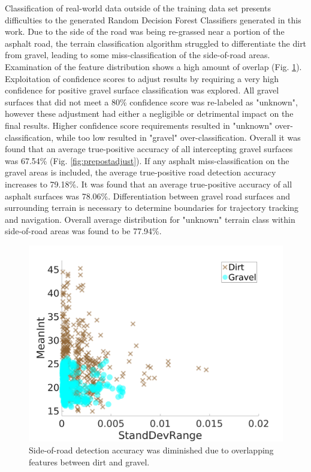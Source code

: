 \documentclass[journal,onecolumn]{IEEEtran}
\begin{document}
		{Classification of real-world data outside of the training data set presents difficulties to the generated Random Decision Forest Classifiers generated in this work. Due to the side of the road was being re-grassed near a portion of the asphalt road, the terrain classification algorithm struggled to differentiate the dirt from gravel, leading to some miss-classification of the side-of-road areas. Examination of the feature distribution shows a high amount of overlap (Fig. \ref{fig:dirt_v_gravel}). Exploitation of confidence scores to adjust results by requiring a very high confidence for positive gravel surface classification was explored. All gravel surfaces that did not meet a 80\% confidence score was re-labeled as "unknown", however these adjustment had either a negligible or detrimental impact on the final results. Higher confidence score requirements resulted in "unknown" over-classification, while too low resulted in "gravel" over-classification. Overall it was found that an average true-positive accuracy of all intercepting gravel surfaces was 67.54\% (Fig. \ref{fig:prepostadjust}). If any asphalt miss-classification on the gravel areas is included, the average true-positive road detection accuracy increases to 79.18\%. It was found that an average true-positive accuracy of all asphalt surfaces was 78.06\%. Differentiation between gravel road surfaces and surrounding terrain is necessary to determine boundaries for trajectory tracking and navigation. Overall average distribution for "unknown" terrain class within side-of-road areas was found to be 77.94\%.}
		
		\begin{figure}[H]
			\centering
			\includegraphics[width=0.75\linewidth]{figures/dirt_v_gravel2}
			\caption[Re-grassed Dirt vs Gravel]{Side-of-road detection accuracy was diminished due to overlapping features between dirt and gravel. }
			\label{fig:dirt_v_gravel}
		\end{figure}
	
\end{document}
